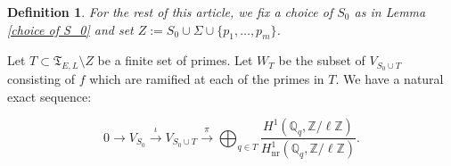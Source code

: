 \documentclass[11pt,reqno]{amsart}
\newtheorem{definition}[theorem]{Definition}
\newcommand{\Z}{\mathbb{Z}}
\newcommand{\Q}{\mathbb{Q}}
\newcommand{\op}[1]{\operatorname{#1}}
\numberwithin{equation}{section}
\begin{document}
\begin{definition}\label{defn of Z}
   For the rest of this article, we fix a choice of $S_0$ as in Lemma \ref{choice of S_0} and set $Z:=S_0\cup \Sigma \cup \{p_1, \dots, p_m\}$.  
\end{definition}

Let $T\subset\mathfrak{T}_{E,L}\setminus Z$ be a finite set of primes. Let $W_T$ be the subset of $V_{{S_0}\cup T}$ consisting of $f$ which are ramified at each of the primes in $T$. We have a natural exact sequence:

\begin{equation}\label{left exact sequence}0\rightarrow V_{S_0}\xrightarrow{\iota} V_{S_0\cup T} \xrightarrow{\pi} \bigoplus_{q\in T} \frac{H^1(\Q_q, \Z/\ell \Z)}{H^1_{\op{nr}}(\Q_q, \Z/\ell \Z)}.\end{equation}
\end{document}
